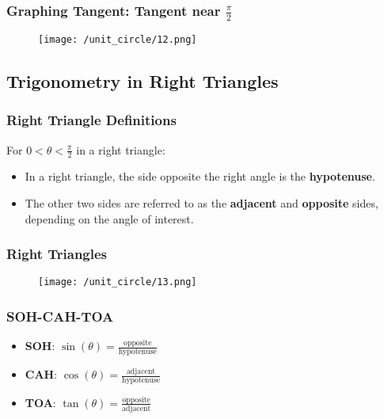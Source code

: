\begin{frame}
    \frametitle{Graphing Tangent: Tangent near \(\frac{\pi}{2}\)}
    \begin{figure}
        \centering
        \texttt{[image: /unit\_circle/12.png]}
    \end{figure}
\end{frame}

\subsection{Trigonometry in Right Triangles}
\begin{frame}
    \frametitle{Right Triangle Definitions}
    For \(0<\theta<\frac{\pi}{2}\) in a right triangle:
    \begin{itemize}
        \item In a right triangle, the side opposite the right angle is the \textbf{hypotenuse}.
        \item The other two sides are referred to as the \textbf{adjacent} and \textbf{opposite} sides, depending on the angle of interest.
    \end{itemize}
\end{frame}
\begin{frame}
    \frametitle{Right Triangles}
    \begin{figure}
        \centering
        \texttt{[image: /unit\_circle/13.png]}
    \end{figure}
\end{frame}

\begin{frame}
    \frametitle{SOH-CAH-TOA}
    \begin{itemize}
        \item \textbf{SOH}: \(\sin(\theta) = \frac{\text{opposite}}{\text{hypotenuse}}\)
        \item \textbf{CAH}: \(\cos(\theta) = \frac{\text{adjacent}}{\text{hypotenuse}}\)
        \item \textbf{TOA}: \(\tan(\theta) = \frac{\text{opposite}}{\text{adjacent}}\)
    \end{itemize}
\end{frame}